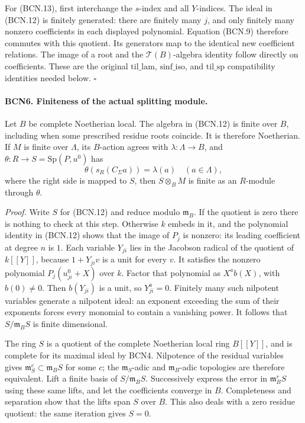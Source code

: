 For (BCN.13), first interchange the \(s\)-index and all \(Y\)-indices.
The ideal in (BCN.12) is finitely generated: there are finitely
many \(j\), and only finitely many nonzero coefficients in
each displayed polynomial.  Equation (BCN.9) therefore
commutes with this quotient.  Its generators map to the
identical new coefficient relations.  The image of a root
and the \(\mathscr T(B)\)-algebra identity follow directly on
coefficients.  These are the original \(\mathrm{til\_lam}\),
\(\mathrm{sinf\_iso}\), and \(\mathrm{til\_sp}\) compatibility
identities needed below.
\hfill\(\square\)

\paragraph{BCN6. Finiteness of the actual splitting module.}\label{claim:BCN6}
Let \(B\) be complete Noetherian local.  The algebra in
(BCN.12) is finite over \(B\), including when some prescribed
residue roots coincide.  It is therefore Noetherian.
If \(M\) is finite over \(\Lambda\), its \(B\)-action agrees
with \(\lambda:\Lambda\to B\), and
\(\theta:R\to S=\mathrm{Sp}(P,u^0)\) has
\[
 \theta(s_R(C_\Sigma a))=\lambda(a)\quad(a\in\Lambda),
                                                               \tag{BCN.14}
\]
where the right side is mapped to \(S\), then \(S\otimes_B M\)
is finite as an \(R\)-module through \(\theta\).

\emph{Proof.}
Write \(S\) for (BCN.12) and reduce modulo \(\mathfrak m_B\).
If the quotient is zero there is nothing to check at this step.
Otherwise \(k\) embeds in it, and the polynomial identity in
(BCN.12) shows that the image of \(P_j\) is nonzero: its
leading coefficient at degree \(n\) is \(1\).  Each variable
\(Y_{ji}\) lies in the Jacobson radical of the quotient of
\(k[[Y]]\), because \(1+Y_{ji}v\) is a unit for every \(v\).
It satisfies the nonzero polynomial \(P_j(u^0_{ji}+X)\) over
\(k\).  Factor that polynomial as \(X^a b(X)\), with \(b(0)\ne0\).
Then \(b(Y_{ji})\) is a unit, so \(Y_{ji}^a=0\).
Finitely many such nilpotent variables generate a nilpotent
ideal: an exponent exceeding the sum of their exponents
forces every monomial to contain a vanishing power.
It follows that \(S/\mathfrak m_BS\) is finite dimensional.

The ring \(S\) is a quotient of the complete Noetherian local
ring \(B[[Y]]\), and is complete for its maximal ideal by
BCN4.  Nilpotence of the residual variables gives
\(\mathfrak m_S^c\subset\mathfrak m_BS\) for some \(c\);
the \(\mathfrak m_S\)-adic and \(\mathfrak m_B\)-adic
topologies are therefore equivalent.  Lift a finite basis
of \(S/\mathfrak m_BS\).  Successively express the error in
\(\mathfrak m_B^rS\) using these same lifts, and let the
coefficients converge in \(B\).  Completeness and separation
show that the lifts span \(S\) over \(B\).
This also deals with a zero residue quotient: the same
iteration gives \(S=0\).


